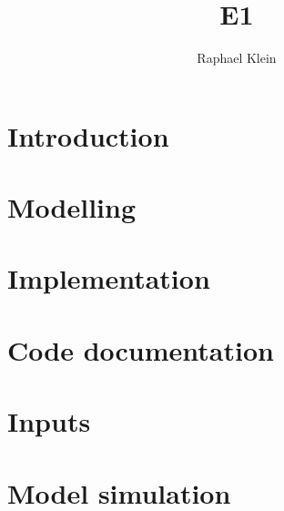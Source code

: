 \documentclass[11pt]{book}
\title{E1}
\author{Raphael Klein}
\begin{document}
\maketitle




\tableofcontents

\chapter{Introduction}


\chapter{Modelling}


\chapter{Implementation}


\chapter{Code documentation}


\chapter{Inputs}


\chapter{Model simulation}

\end{document}

